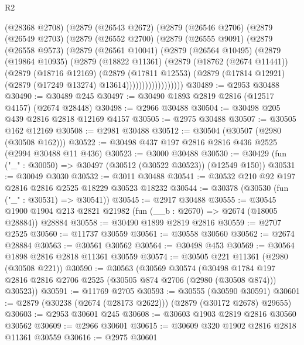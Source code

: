 \begin{lexlean}{R2}
\begin{coremodule}
          (@28368 @2708)
          (@2879
            (@26543 @2672)
            (@2879
              (@26546 @2706)
              (@2879
                (@26549 @2703)
                (@2879
                  (@26552 @2700)
                  (@2879
                    (@26555 @9091)
                    (@2879
                      (@26558 @9573)
                      (@2879
                        (@26561 @10041)
                        (@2879
                          (@26564 @10495)
                          (@2879
                            (@19864 @10935)
                            (@2879
                              (@18822 @11361)
                              (@2879
                                (@18762 (@2674 @11441))
                                (@2879
                                  (@18716 @12169)
                                  (@2879
                                    (@17811 @12553)
                                    (@2879
                                      (@17814 @12921)
                                      (@2879 (@17249 @13274) @13614))))))))))))))))))
@30489 := @2953 @30488
@30490 := @30489 @245
@30497 := @30490 @1893 @2819 @2816 (@12517 @4157) (@2674 @28448)
@30498 := @2966 @30488
@30504 := @30498 @205 @439 @2816 @2818 @12169 @4157
@30505 := @2975 @30488
@30507 := @30505 @162 @12169
@30508 := @2981 @30488
@30512 := @30504 (@30507 (@2980 (@30508 @162)))
@30522 := @30498 @437 @197 @2816 @2816 @436 @2525 (@2994 @30488 @11 @436)
@30523 := @3000 @30488
@30530 := @30429 (fun ("_" : @30050) => @30497 (@30512 (@30522 @30523)) (@12549 @150))
@30531 := @30049 @3030
@30532 := @3011 @30488
@30541 := @30532 @210 @92 @197 @2816 @2816 @2525 @18229 @30523 @18232
@30544 := @30378 (@30530 (fun ("_" : @30531) => @30541))
@30545 := @2917 @30488
@30555 := @30545 @1900 @1904 @213 @2821 @21982 (fun (__b : @2670) => @2674 (@18005 @28884)) @28884
@30558 := @30490 @1899 @2819 @2816
@30559 := @2707 @2525
@30560 := @11737 @30559
@30561 := @30558 @30560
@30562 := @2674 @28884
@30563 := @30561 @30562
@30564 := @30498 @453
@30569 := @30564 @1898 @2816 @2818 @11361 @30559
@30574 := @30505 @221 @11361 (@2980 (@30508 @221))
@30590 := @30563
    (@30569
      @30574
      (@30498 @1784 @197 @2816 @2816 @2706 @2525 (@30505 @874 @2706 (@2980 (@30508 @874))) @30523))
@30591 := @11769 @2705
@30593 := @30555 (@30590 @30591)
@30601 := @2879 (@30238 (@2674 (@28173 @2622))) (@2879 (@30172 @2678) @29655)
@30603 := @2953 @30601 @245
@30608 := @30603 @1903 @2819 @2816 @30560 @30562
@30609 := @2966 @30601
@30615 := @30609 @320 @1902 @2816 @2818 @11361 @30559
@30616 := @2975 @30601

\end{coremodule}
\end{lexlean}
